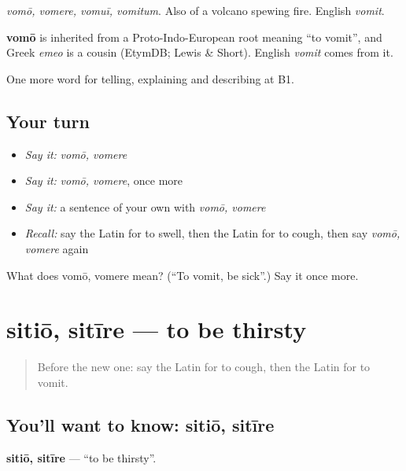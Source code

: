 \emph{vomō, vomere, vomuī, vomitum}. Also of a volcano spewing fire. English \emph{vomit}.

\begin{cousinweb}
\textbf{vomō} is inherited from a Proto-Indo-European root meaning \textquotedblleft{}to vomit\textquotedblright{}, and Greek \emph{emeo} is a cousin (EtymDB; Lewis \& Short). English \emph{vomit} comes from it.
\end{cousinweb}

\begin{grammarlens}[title={What you've built}]
One more word for telling, explaining and describing at B1.
\end{grammarlens}

\subsection*{Your turn}
\begin{itemize}
\raggedright
  \item \emph{Say it:} \emph{vomō, vomere}
  \item \emph{Say it:} \emph{vomō, vomere}, once more
  \item \emph{Say it:} a sentence of your own with \emph{vomō, vomere}
  \item \emph{Recall:} say the Latin for to swell, then the Latin for to cough, then say \emph{vomō, vomere} again
\end{itemize}

\begin{tcolorbox}[breakable,colback=teal!4,colframe=teal!35!black,title={Before you move on}]
What does vomō, vomere mean? (\textquotedblleft{}To vomit, be sick\textquotedblright{}.) Say it once more.
\end{tcolorbox}
\section[sitiō, sitīre]{sitiō, sitīre — to be thirsty}

\label{lesson:LA-C525-sitio}



\begin{quote}
Before the new one: say the Latin for to cough, then the Latin for to vomit.
\end{quote}

\subsection*{You'll want to know: sitiō, sitīre}
\textbf{sitiō, sitīre} — \textquotedblleft{}to be thirsty\textquotedblright{}.

